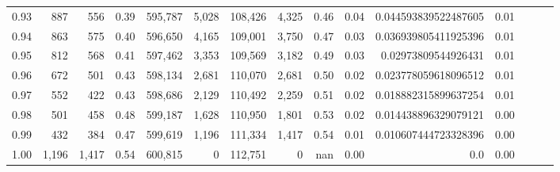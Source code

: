 \begin{tabular}{rrrrrrrrrrrrrrr}
0.93 &     887 &    556 &  0.39 &  595,787 &    5,028 &  108,426 &    4,325 &  0.46 &  0.04 &  0.044593839522487605 &      0.01 \\
0.94 &     863 &    575 &  0.40 &  596,650 &    4,165 &  109,001 &    3,750 &  0.47 &  0.03 &  0.036939805411925396 &      0.01 \\
0.95 &     812 &    568 &  0.41 &  597,462 &    3,353 &  109,569 &    3,182 &  0.49 &  0.03 &   0.02973809544926431 &      0.01 \\
0.96 &     672 &    501 &  0.43 &  598,134 &    2,681 &  110,070 &    2,681 &  0.50 &  0.02 &  0.023778059618096512 &      0.01 \\
0.97 &     552 &    422 &  0.43 &  598,686 &    2,129 &  110,492 &    2,259 &  0.51 &  0.02 &  0.018882315899637254 &      0.01 \\
0.98 &     501 &    458 &  0.48 &  599,187 &    1,628 &  110,950 &    1,801 &  0.53 &  0.02 &  0.014438896329079121 &      0.00 \\
0.99 &     432 &    384 &  0.47 &  599,619 &    1,196 &  111,334 &    1,417 &  0.54 &  0.01 &  0.010607444723328396 &      0.00 \\
1.00 &   1,196 &  1,417 &  0.54 &  600,815 &        0 &  112,751 &        0 &   nan &  0.00 &                   0.0 &      0.00 \\
\bottomrule
\end{tabular}
